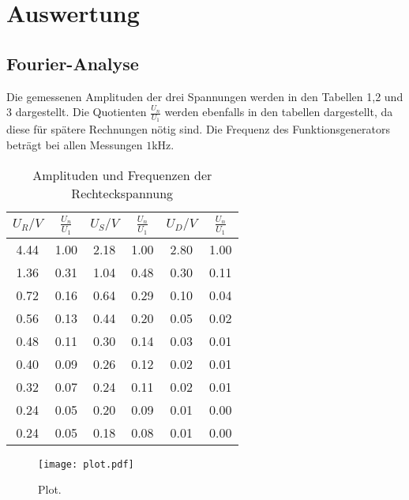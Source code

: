 \section{Auswertung}
\label{sec:Auswertung}

\subsection{Fourier-Analyse}

Die gemessenen Amplituden der drei Spannungen werden in den Tabellen 1,2 und 3 dargestellt.
Die Quotienten $\frac{U_n}{U_1}$ werden ebenfalls in den tabellen dargestellt, da diese für
spätere Rechnungen nötig sind.
 Die Frequenz des Funktionsgenerators beträgt bei allen Messungen $1$kHz.

\begin{table}[H]
  \centering
  \caption{Amplituden und Frequenzen der Rechteckspannung}
  \label{tab:Rechteckspannung}
  \begin{tabular}{c c c c c c}
    \toprule
    $U_R/V$ & $\frac{U_n}{U_1}$ & $U_S/V$ & $\frac{U_n}{U_1}$ & $U_D/V$ & $\frac{U_n}{U_1}$ \\
    \midrule
    4.44 & 1.00 & 2.18 & 1.00 & 2.80 &  1.00 \\
    1.36 & 0.31 & 1.04 & 0.48 & 0.30 &  0.11\\
    0.72 & 0.16 & 0.64 & 0.29 & 0.10 &  0.04\\
    0.56 & 0.13 & 0.44 & 0.20 & 0.05 &  0.02\\
    0.48 & 0.11 & 0.30 & 0.14 & 0.03 &  0.01\\
    0.40 & 0.09 & 0.26 & 0.12 & 0.02 &  0.01\\
    0.32 & 0.07 & 0.24 & 0.11 & 0.02 &  0.01\\
    0.24 & 0.05 & 0.20 & 0.09 & 0.01 &  0.00\\
    0.24 & 0.05 & 0.18 & 0.08 & 0.01 &  0.00\\
    \bottomrule
  \end{tabular}
\end{table}

\begin{figure}
  \centering
  \texttt{[image: plot.pdf]}
  \caption{Plot.}
  \label{fig:plot}
\end{figure}
